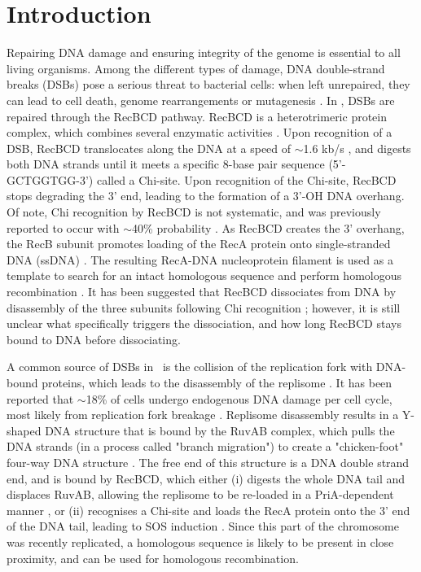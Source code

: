 \section*{Introduction}
Repairing DNA damage and ensuring integrity of the genome is essential to all living organisms. Among the different types of damage, DNA double-strand breaks (DSBs) pose a serious threat to bacterial cells: when left unrepaired, they can lead to cell death, genome rearrangements or mutagenesis \cite{Wyman2006}. In \ecoli, DSBs are repaired through the RecBCD pathway. RecBCD is a heterotrimeric protein complex, which combines several enzymatic activities \cite{Dillingham2008}. Upon recognition of a DSB, RecBCD translocates along the DNA at a speed of $\sim$1.6 kb/s \cite{Wiktor2018}, and digests both DNA strands until it meets a specific 8-base pair sequence (5'-GCTGGTGG-3') called a Chi-site. Upon recognition of the Chi-site, RecBCD stops degrading the 3' end, leading to the formation of a 3'-OH DNA overhang. Of note, Chi recognition by RecBCD is not systematic, and was previously reported to occur with $\sim$40\% probability \cite{Taylor1992,Cockram2015}. As RecBCD creates the 3' overhang, the RecB subunit promotes loading of the RecA protein onto single-stranded DNA (ssDNA) \cite{Churchill2000, Spies2006}. The resulting RecA-DNA nucleoprotein filament is used as a template to search for an intact homologous sequence and perform homologous recombination \cite{Wyman2004,Wiktor2021}. It has been suggested that RecBCD dissociates from DNA by disassembly of the three subunits following Chi recognition \cite{Taylor1999}; however, it is still unclear what specifically triggers the dissociation, and how long RecBCD stays bound to DNA before dissociating.

A common source of DSBs in \ecoli\ is the collision of the replication fork with DNA-bound proteins, which leads to the disassembly of the replisome \cite{Michel1997}. It has been reported that $\sim$18\% of cells undergo endogenous DNA damage per cell cycle, most likely from replication fork breakage \cite{Sinha2018}. Replisome disassembly results in a Y-shaped DNA structure that is bound by the RuvAB complex, which pulls the DNA strands (in a process called "branch migration") to create a "chicken-foot" four-way DNA structure \cite{Seigneur1998}. The free end of this structure is a DNA double strand end, and is bound by RecBCD, which either (i) digests the whole DNA tail and displaces RuvAB, allowing the replisome to be re-loaded in a PriA-dependent manner \cite{Seigneur1998}, or (ii) recognises a Chi-site and loads the RecA protein onto the 3' end of the DNA tail, leading to SOS induction \cite{Michel2001}. Since this part of the chromosome was recently replicated, a homologous sequence is likely to be present in close proximity, and can be used for homologous recombination.

